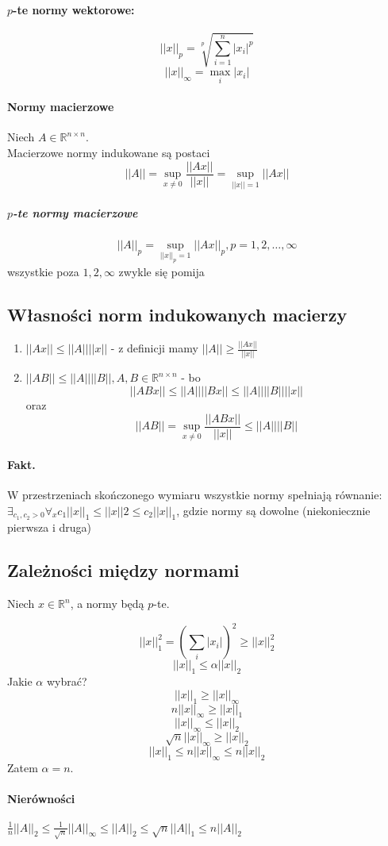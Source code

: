 \documentclass{article}
\begin{document}
\paragraph{$p$-te normy wektorowe:}
$$||x||_p = \sqrt[p]{\sum_{i=1}^{n}|x_i|^p}$$
$$||x||_\infty = \max_i |x_i|$$
\paragraph{Normy macierzowe}
Niech $A\in \mathbb{R}^{n\times n}$.\\
Macierzowe normy indukowane są postaci
$$||A||=\sup_{x\not=0}\frac{||Ax||}{||x||}=\sup_{||x||=1}||Ax||$$
\subparagraph{$p$-te normy macierzowe}
$$||A||_p=\sup_{||x||_p=1}||Ax||_p, p=1, 2, \ldots, \infty$$
wszystkie poza $1, 2, \infty$ zwykle się pomija
\subsection{Własności norm indukowanych macierzy}
\begin{enumerate}
	\item $||Ax||\leq||A||||x||$ - z definicji mamy $ ||A||\geq\frac{||Ax||}{||x||} $
	\item $ ||AB||\leq||A||||B||, A,B\in \mathbb{R}^{n\times n} $ - bo
	$$ ||ABx||\leq||A||||Bx||\leq||A||||B||||x|| $$ oraz
	$$ ||AB||=\sup_{x\not=0}\frac{||ABx||}{||x||}\leq||A||||B|| $$
\end{enumerate}
\paragraph{Fakt.} W przestrzeniach skończonego wymiaru wszystkie normy spełniają równanie:
$ \exists_{c_1, c_2>0}\forall_{x}c_1||x||_1\leq||x||2\leq c_2||x||_1 $, gdzie normy są dowolne (niekoniecznie pierwsza i druga)

\subsection{Zależności między normami}
Niech $ x\in\mathbb{R}^n $, a normy będą $p$-te.

$$ ||x||^2_1=(\sum_i|x_i|)^2 \ge ||x||_2^2$$
$$ ||x||_1\le \alpha||x||_2 $$
Jakie $\alpha$ wybrać?
$$ ||x||_1\ge ||x||_\infty $$
$$ n||x||_\infty\ge ||x||_1 $$
$$ ||x||_\infty\le ||x||_2 $$
$$ \sqrt n||x||_\infty\ge ||x||_2 $$
$$ ||x||_1\leq n||x||_\infty\leq n||x||_2 $$
Zatem $\alpha=n$.
\paragraph{Nierówności}
$ \frac1n ||A||_2\le\frac1{\sqrt n}||A||_\infty\le||A||_2\le\sqrt{n} ||A||_1\le n||A||_2$
\end{document}
